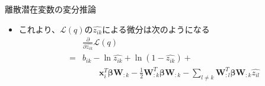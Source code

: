 \documentclass[dvipdfmx,notheorems,t]{beamer}
\begin{document}
\begin{frame}{離散潜在変数の変分推論}
\begin{itemize}
\begin{itemize}
		\item これより、$\mathcal{L}(q)$の$\widehat{z_{ik}}$による微分は次のようになる
		\begin{eqnarray}
			&& \frac{\partial}{\partial \widehat{z_{ik}}} \mathcal{L}(q) \nonumber \\
			&=& b_{ik} - \ln \widehat{z_{ik}} + \ln (1 - \widehat{z_{ik}}) + \nonumber \\
			&& \qquad \bm{x}_i^T \bm{\beta} \bm{W}_{:k} - \frac{1}{2} \bm{W}_{:k}^T \bm{\beta} \bm{W}_{:k} - \sum_{l \neq k} \bm{W}_{:l}^T \bm{\beta} \bm{W}_{:k} \widehat{z_{il}}
		\end{eqnarray}
	\end{itemize}
\end{itemize}

\end{frame}
\end{document}
